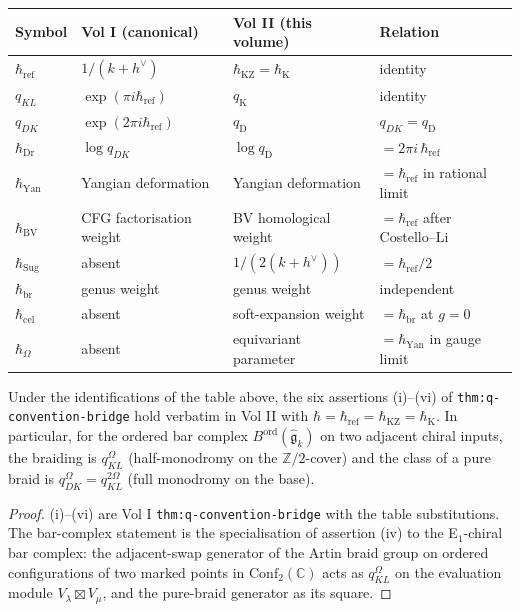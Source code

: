 \begin{center}
\begin{tabular}{llll}
\hline
Symbol & Vol I (canonical) & Vol II (this volume) & Relation \\
\hline
$\hbar_{\mathrm{ref}}$ & $1/(k+h^\vee)$ & $\hbar_{\mathrm{KZ}}=\hbar_{\mathrm{K}}$ & identity \\
$q_{KL}$ & $\exp(\pi i\hbar_{\mathrm{ref}})$ & $q_{\mathrm{K}}$ & identity \\
$q_{DK}$ & $\exp(2\pi i\hbar_{\mathrm{ref}})$ & $q_{\mathrm{D}}$ & $q_{DK}=q_{\mathrm{D}}$ \\
$\hbar_{\mathrm{Dr}}$ & $\log q_{DK}$ & $\log q_{\mathrm{D}}$ & $=2\pi i\,\hbar_{\mathrm{ref}}$ \\
$\hbar_{\mathrm{Yan}}$ & Yangian deformation & Yangian deformation & $=\hbar_{\mathrm{ref}}$ in rational limit \\
$\hbar_{\mathrm{BV}}$ & CFG factorisation weight & BV homological weight & $=\hbar_{\mathrm{ref}}$ after Costello--Li \\
$\hbar_{\mathrm{Sug}}$ & absent & $1/(2(k+h^\vee))$ & $=\hbar_{\mathrm{ref}}/2$ \\
$\hbar_{\mathrm{br}}$ & genus weight & genus weight & independent \\
$\hbar_{\mathrm{cel}}$ & absent & soft-expansion weight & $=\hbar_{\mathrm{br}}$ at $g{=}0$ \\
$\hbar_{\Omega}$ & absent & equivariant parameter & $=\hbar_{\mathrm{Yan}}$ in gauge limit \\
\hline
\end{tabular}
\end{center}

\begin{theorem}
\label{thm:q-convention-bridge-v2}
Under the identifications of the table above, the six assertions
\textup{(i)--(vi)} of \textup{\texttt{thm:q-convention-bridge}} hold verbatim in
Vol II with $\hbar = \hbar_{\mathrm{ref}} = \hbar_{\mathrm{KZ}} = \hbar_{\mathrm{K}}$.
In particular, for the ordered bar complex $B^{\mathrm{ord}}(\widehat{\mathfrak{g}}_{k})$
on two adjacent chiral inputs, the braiding is $q_{KL}^{\Omega}$
(half-monodromy on the $\mathbb{Z}/2$-cover) and the class of a pure braid is
$q_{DK}^{\Omega} = q_{KL}^{2\Omega}$ (full monodromy on the base).
\end{theorem}

\begin{proof}
(i)--(vi) are Vol I \texttt{thm:q-convention-bridge} with the table
substitutions. The bar-complex statement is the specialisation of assertion
(iv) to the E$_{1}$-chiral bar complex: the adjacent-swap generator of the
Artin braid group on ordered configurations of two marked points in
$\mathrm{Conf}_{2}(\mathbb{C})$ acts as $q_{KL}^{\Omega}$ on the evaluation
module $V_{\lambda}\boxtimes V_{\mu}$, and the pure-braid generator as its
square.
\end{proof}

